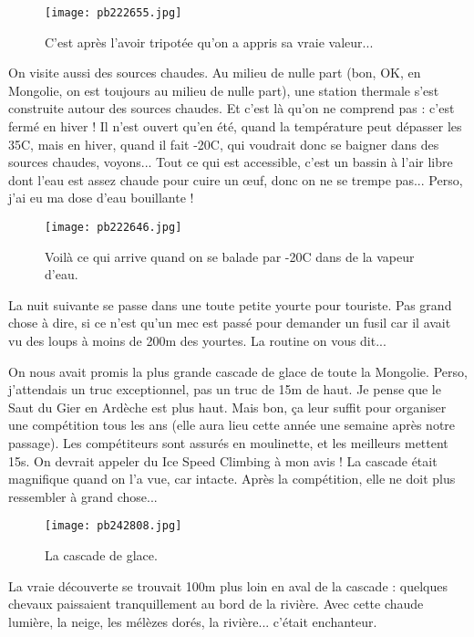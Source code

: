 \documentclass{book}
\begin{document}
\begin{figure}[h]
\centering
\texttt{[image: pb222655.jpg]}
\caption*{ C'est après l'avoir tripotée qu'on a appris sa vraie valeur...}
\end{figure}

On visite aussi des sources chaudes. Au milieu de nulle part (bon, OK, en Mongolie, on est toujours au milieu de nulle part), une station thermale s'est construite autour des sources chaudes. Et c'est là qu'on ne comprend pas : c'est fermé en hiver ! Il n'est ouvert qu'en été, quand la température peut dépasser les 35\textdegree C, mais en hiver, quand il fait -20\textdegree C, qui voudrait donc se baigner dans des sources chaudes, voyons... Tout ce qui est accessible, c'est un bassin à l'air libre dont l'eau est assez chaude pour cuire un œuf, donc on ne se trempe pas... Perso, j'ai eu ma dose d'eau bouillante !


\begin{figure}[h]
\centering
\texttt{[image: pb222646.jpg]}
\caption*{ Voilà ce qui arrive quand on se balade par -20\textdegree C dans de la vapeur d'eau.}
\end{figure}

La nuit suivante se passe dans une toute petite yourte pour touriste. Pas grand chose à dire, si ce n'est qu'un mec est passé pour demander un fusil car il avait vu des loups à moins de 200m des yourtes. La routine on vous dit...

On nous avait promis la plus grande cascade de glace de toute la Mongolie. Perso, j'attendais un truc exceptionnel, pas un truc de 15m de haut. Je pense que le Saut du Gier en Ardèche est plus haut. Mais bon, ça leur suffit pour organiser une compétition tous les ans (elle aura lieu cette année une semaine après notre passage). Les compétiteurs sont assurés en moulinette, et les meilleurs mettent 15s. On devrait appeler du Ice Speed Climbing à mon avis ! La cascade était magnifique quand on l'a vue, car intacte. Après la compétition, elle ne doit plus ressembler à grand chose...


\begin{figure}[h]
\centering
\texttt{[image: pb242808.jpg]}
\caption*{ La cascade de glace.}
\end{figure}

La vraie découverte se trouvait 100m plus loin en aval de la cascade : quelques chevaux paissaient tranquillement au bord de la rivière. Avec cette chaude lumière, la neige, les mélèzes dorés, la rivière... c'était enchanteur.
\end{document}
